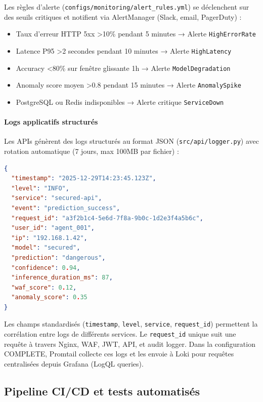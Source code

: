 Les règles d'alerte (\texttt{configs/monitoring/alert\_rules.yml}) se déclenchent sur des seuils critiques et notifient via AlertManager (Slack, email, PagerDuty) :

\begin{itemize}
    \item Taux d'erreur HTTP 5xx >10\% pendant 5 minutes → Alerte \texttt{HighErrorRate}
    \item Latence P95 >2 secondes pendant 10 minutes → Alerte \texttt{HighLatency}
    \item Accuracy <80\% sur fenêtre glissante 1h → Alerte \texttt{ModelDegradation}
    \item Anomaly score moyen >0.8 pendant 15 minutes → Alerte \texttt{AnomalySpike}
    \item PostgreSQL ou Redis indisponibles → Alerte critique \texttt{ServiceDown}
\end{itemize}

\paragraph{Logs applicatifs structurés}

Les APIs génèrent des logs structurés au format JSON (\texttt{src/api/logger.py}) avec rotation automatique (7 jours, max 100MB par fichier) :

\begin{lstlisting}[language=JSON, caption=Exemple de log structuré]
{
  "timestamp": "2025-12-29T14:23:45.123Z",
  "level": "INFO",
  "service": "secured-api",
  "event": "prediction_success",
  "request_id": "a3f2b1c4-5e6d-7f8a-9b0c-1d2e3f4a5b6c",
  "user_id": "agent_001",
  "ip": "192.168.1.42",
  "model": "secured",
  "prediction": "dangerous",
  "confidence": 0.94,
  "inference_duration_ms": 87,
  "waf_score": 0.12,
  "anomaly_score": 0.35
}
\end{lstlisting}

Les champs standardisés (\texttt{timestamp}, \texttt{level}, \texttt{service}, \texttt{request\_id}) permettent la corrélation entre logs de différents services. Le \texttt{request\_id} unique suit une requête à travers Nginx, WAF, JWT, API, et audit logger. Dans la configuration COMPLETE, Promtail collecte ces logs et les envoie à Loki pour requêtes centralisées depuis Grafana (LogQL queries).


\subsection{Pipeline CI/CD et tests automatisés}

